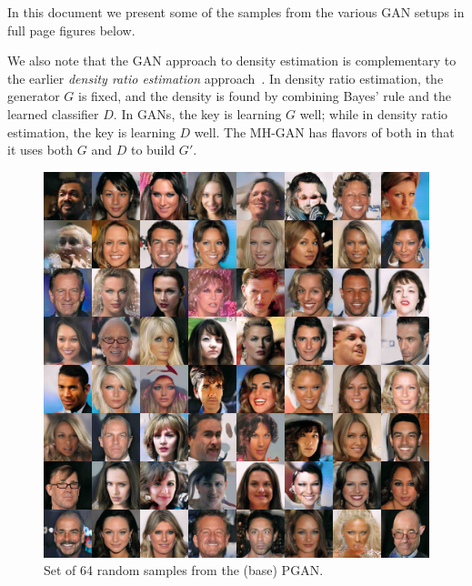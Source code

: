 In this document we present some of the samples from the various GAN setups in full page figures below.

We also note that the GAN approach to density estimation is complementary to the earlier \emph{density ratio estimation} approach~\citep{Sugiyama2012}\@.
In density ratio estimation, the generator $G$ is fixed, and the density is found by combining Bayes' rule and the learned classifier $D$.
In GANs, the key is learning $G$ well; while in density ratio estimation, the key is learning $D$ well.
The MH-GAN has flavors of both in that it uses both $G$ and $D$ to build $G'$.

\begin{figure}[htbp]
    \centering
    \includegraphics[width=\exfactor\textwidth]{figures/pgan/all_base_iso_base_lq.jpg}
    \caption{
    Set of 64 random samples from the (base) PGAN\@.
    }
\end{figure}

